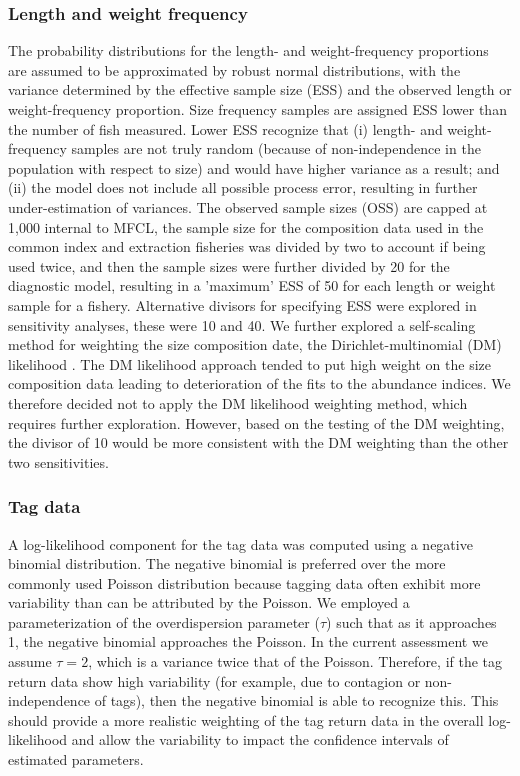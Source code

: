 \subsubsection{Length and weight frequency}
\label{sec:sizefreq_likelihood}

The probability distributions for the length- and weight-frequency proportions are assumed to be approximated by robust normal distributions, with the variance determined by the effective sample size (ESS) and the observed length or weight-frequency proportion. Size frequency samples are assigned ESS lower than the number of fish measured. Lower ESS recognize that (i) length- and weight-frequency samples are not truly random (because of non-independence in the population with respect to size) and would have higher variance as a result; and (ii) the model does not include all possible process error, resulting in further under-estimation of variances. The observed sample sizes (OSS) are capped at 1,000 internal to MFCL, the sample size for the composition data used in the common index and extraction fisheries was divided by two to account if being used twice, and then the sample sizes were further divided by 20 for the diagnostic model, resulting in a 'maximum' ESS of 50 for each length or weight sample for a fishery. Alternative divisors for specifying ESS were explored in sensitivity analyses, these were 10 and 40. We further explored a self-scaling method for weighting the size composition date, the Dirichlet-multinomial (DM) likelihood \citep{thorson_model-based_2017}. The DM likelihood approach tended to put high weight on the size composition data leading to deterioration of the fits to the abundance indices. We therefore decided not to apply the DM likelihood weighting method, which requires further exploration. However, based on the testing of the DM weighting, the divisor of 10 would be more consistent with the DM weighting than the other two sensitivities.

\subsubsection{Tag data}
\label{sec:tagdata_likelihood}

A log-likelihood component for the tag data was computed using a negative binomial distribution. The negative binomial is preferred over the more commonly used Poisson distribution because tagging data often exhibit more variability than can be attributed by the Poisson. We employed a parameterization of the overdispersion parameter ($\tau$) such that as it approaches 1, the negative binomial approaches the Poisson. In the current assessment we assume $\tau=2$, which is a variance twice that of the Poisson. Therefore, if the tag return data show high variability (for example, due to contagion or non-independence of tags), then the negative binomial is able to recognize this. This should provide a more realistic weighting of the tag return data in the overall log-likelihood and allow the variability to impact the confidence intervals of estimated parameters.


